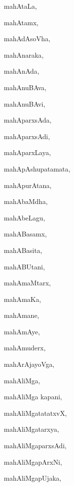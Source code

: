 \begin{multicols}{3}
{\noindent
{mahAtaLa}, \pageref{mahAtaLa}

\noindent
{mahAtamx}, \pageref{mahAtamx}

\noindent
{mahAdAsoVha}, \pageref{mahAdAsoVha}

\noindent
{mahAnaraka}, \pageref{mahAnaraka}

\noindent
{mahAnAda}, \pageref{mahAnAda}

\noindent
{mahAnuBAva}, \pageref{mahAnuBAva}

\noindent
{mahAnuBAvi}, \pageref{mahAnuBAvi}

\noindent
{mahAparxsAda}, \pageref{mahAparxsAda}

\noindent
{mahAparxsAdi}, \pageref{mahAparxsAdi}

\noindent
{mahAparxLaya}, \pageref{mahAparxLaya}

\noindent
{mahApAshupatamata}, \pageref{mahApAshupatamata}

\noindent
{mahApurAtana}, \pageref{mahApurAtana}

\noindent
{mahAbaMdha}, \pageref{mahAbaMdha}

\noindent
{mahAbeLagu}, \pageref{mahAbeLagu}

\noindent
{mahABasamx}, \pageref{mahABasamx}

\noindent
{mahABasita}, \pageref{mahABasita}

\noindent
{mahABUtani}, \pageref{mahABUtani}

\noindent
{mahAmaMtarx}, \pageref{mahAmaMtarx}

\noindent
{mahAmaKa}, \pageref{mahAmaKa}

\noindent
{mahAmane}, \pageref{mahAmane}

\noindent
{mahAmAye}, \pageref{mahAmAye}

\noindent
{mahAmuderx}, \pageref{mahAmuderx}

\noindent
{mahArAjayoVga}, \pageref{mahArAjayoVga}

\noindent
{mahAliMga}, \pageref{mahAliMga}

\noindent
{mahAliMga kapani}, \pageref{mahAliMga kapani}

\noindent
{mahAliMgatatatxvX}, \pageref{mahAliMgatatatxvX}

\noindent
{mahAliMgatarxya}, \pageref{mahAliMgatarxya}

\noindent
{mahAliMgaparxsAdi}, \pageref{mahAliMgaparxsAdi}

\noindent
{mahAliMgapArxNi}, \pageref{mahAliMgapArxNi}

\noindent
{mahAliMgapUjaka}, \pageref{mahAliMgapUjaka}

}
\end{multicols}
